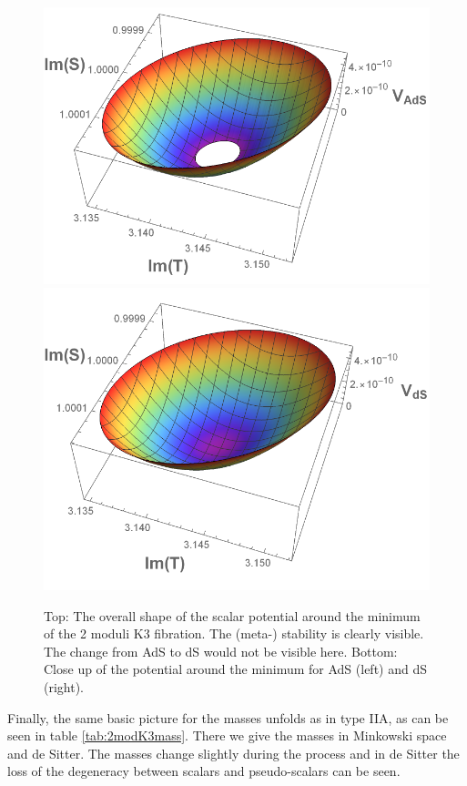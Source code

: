 \documentclass[12pt]{report}
\begin{document}
\begin{figure}[htb]
\centering
\includegraphics[scale=0.55]{quevedo_314_3D_Ads.pdf} \qquad
\includegraphics[scale=0.53]{quevedo_314_3D_ds.pdf}
\caption{Top: The overall shape of the scalar potential around the minimum of the 2 moduli K3 fibration. The (meta-) stability is clearly visible. The change from AdS to dS would not be visible here. Bottom: Close up of the potential around the minimum for AdS (left) and dS (right).}
\label{fig:2modK33d}
\end{figure}
Finally, the same basic picture for the masses unfolds as in type IIA, as can be seen in table \ref{tab:2modK3mass}. There we give the masses in Minkowski space and de Sitter. The masses change slightly during the process and in de Sitter the loss of the degeneracy between scalars and pseudo-scalars can be seen.
\end{document}
